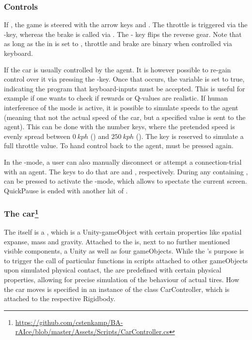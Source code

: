 \subsubsection{Controls}

If , the game is steered with the arrow keys \keystroke{$\leftarrow$} and \mbox{\keystroke{$\rightarrow$}.} The throttle is triggered via the -key, whereas the brake is called via . The  - key flips the reverse gear. Note that as long as the  in  is set to , throttle and brake are binary when controlled via keyboard. 

If  the car is usually controlled by the agent. It is however possible to re-gain control over it via pressing the -key. Once that occurs, the variable  is set to true, indicating the program that keyboard-inputs must be accepted. This is useful for example if one wants to check if rewards or Q-values are realistic. If human interference of the  mode is active, it is possible to simulate speeds to the agent (meaning that not the actual speed of the car, but a specified value is sent to the agent). This can be done with the number keys, where the pretended speed is evenly spread between $0~ kph$ () and $250~ kph$ (). The  key is reserved to simulate a full throttle value. To hand control back to the agent,  must be pressed again. 

In the -mode, a user can also manually disconnect or attempt a connection-trial with an agent. The keys to do that are  and , respectively. During any  containing ,  can be pressed to activate the -mode, which allows to spectate the current screen. QuickPause is ended with another hit of . 

\subsubsection{The car\footnote{\url{https://github.com/cstenkamp/BA-rAIce/blob/master/Assets/Scripts/CarController.cs}}}

The  itself is a , which is a Unity-gameObject with certain properties like spatial expanse, mass and gravity. Attached to the  is, next to no further mentioned visible components, a Unity  as well as four  gameObjects. While the 's purpose is to trigger the call of particular functions in scripts attached to other gameObjects upon simulated physical contact, the  are predefined with certain physical properties, allowing for precise simulation of the behaviour of actual tires. How the car moves is specified in an instance of the class CarController, which is attached to the respective Rigidbody.

